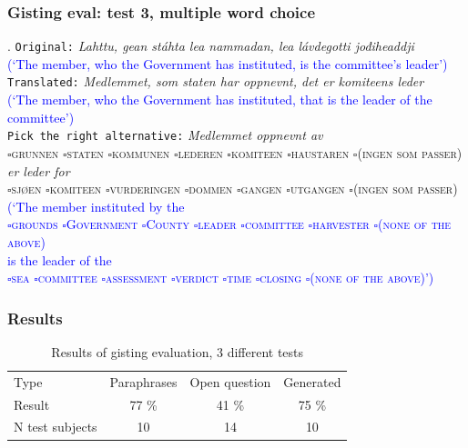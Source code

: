 \documentclass[notes=hide]{beamer}
\begin{document}
\begin{frame}\frametitle{Gisting eval: test 3, multiple word choice}
  \ex.
  {\footnotesize
    \texttt{Original:} \textit{Lahttu, gean stáhta lea nammadan, lea lávdegotti jođiheaddji}\\
    \textcolor{blue}{(`The member, who the Government has instituted, is the committee's leader')}\\
    \texttt{Translated:} \textit{Medlemmet, som staten har oppnevnt, det er komiteens leder}\\
    \textcolor{blue}{(`The member, who the Government has instituted, that is the leader of the committee')}\\
    \texttt{Pick the right alternative:}
    \textit{Medlemmet oppnevnt av}\\
    \textsc{$\square$grunnen $\square$staten $\square$kommunen $\square$lederen $\square$komiteen $\square$haustaren $\square$(ingen som passer)}\\
    \textit{er leder for}\\
    \textsc{ $\square$sjøen $\square$komiteen $\square$vurderingen $\square$dommen $\square$gangen $\square$utgangen $\square$(ingen som passer)}\\
    \textcolor{blue}{(`The member instituted by the\\
    \textsc{$\square$grounds $\square$Government $\square$County $\square$leader $\square$committee $\square$harvester $\square$(none of the above)}\\
    is the leader of the\\
    \textsc{$\square$sea $\square$committee $\square$assessment $\square$verdict $\square$time $\square$closing $\square$(none of the above)}')}
  }

\end{frame}

\begin{frame}\frametitle{Results}
  \begin{table}[htdp]
    \caption{Results of gisting evaluation, 3 different tests}
    \begin{center}
      \begin{tabular}{lccc}
        Type & Paraphrases & Open question & Generated \\
        Result & 77 \% & 41 \% & 75 \% \\
        N test subjects & 10 & 14  & 10  \\
      \end{tabular}
    \end{center}
    \label{eval}
  \end{table}

\end{frame}
\end{document}

